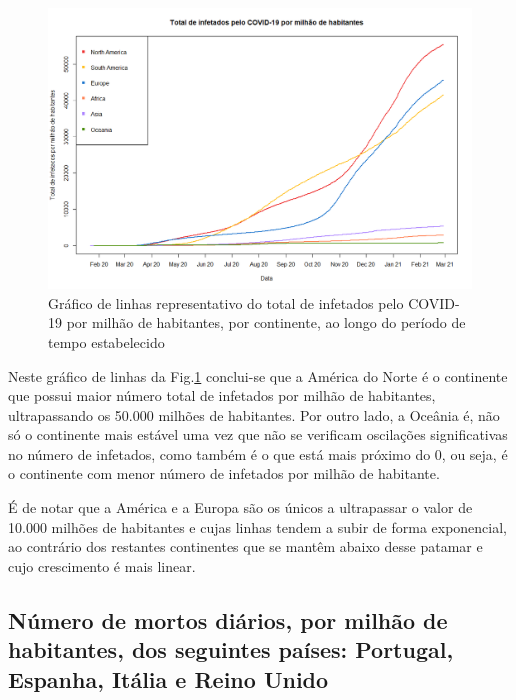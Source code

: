 \documentclass[conference]{IEEEtran}
\begin{document}
\begin{figure}[htbp]
\centerline{\includegraphics[width=0.95\columnwidth]{images/01.b.png}}
\caption{Gráfico de linhas representativo do total de infetados pelo COVID-19 por milhão de habitantes, por continente, ao longo do período de tempo estabelecido}
\label{1b}
\end{figure}

Neste gráfico de linhas da Fig.\ref{1b} conclui-se que a América do Norte é o continente que possui maior número total de infetados por milhão de habitantes, ultrapassando os 50.000 milhões de habitantes. Por outro lado, a Oceânia é, não só o continente mais estável uma vez que não se verificam oscilações significativas no número de infetados, como também é o que está mais próximo do 0, ou seja, é o continente com menor número de infetados por milhão de habitante.

É de notar que a América e a Europa são os únicos a ultrapassar o valor de 10.000 milhões de habitantes e cujas linhas tendem a subir de forma exponencial, ao contrário dos restantes continentes que se mantêm abaixo desse patamar e cujo crescimento é mais linear.


\subsection{Número de mortos diários, por milhão de habitantes, dos seguintes países: Portugal, Espanha, Itália e Reino Unido}
\end{document}
